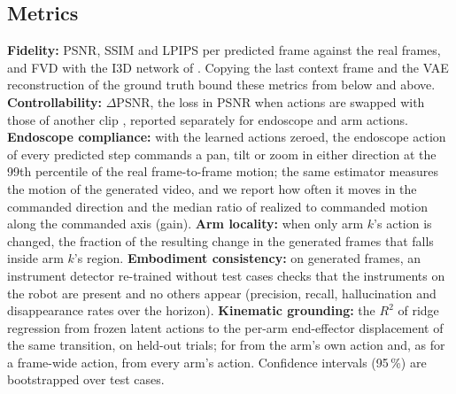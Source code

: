 \subsection{Metrics}
\textbf{Fidelity:} PSNR, SSIM \cite{ssim} and LPIPS \cite{lpips} per predicted frame against the real frames, and FVD \cite{fvd} with the I3D network of \cite{styleganv}. Copying the last context frame and the VAE reconstruction of the ground truth bound these metrics from below and above.
\textbf{Controllability:} $\Delta$PSNR, the loss in PSNR when actions are swapped with those of another clip \cite{genie,surgwm}, reported separately for endoscope and arm actions.
\textbf{Endoscope compliance:} with the learned actions zeroed, the endoscope action of every predicted step commands a pan, tilt or zoom in either direction at the 99th percentile of the real frame-to-frame motion; the same estimator measures the motion of the generated video, and we report how often it moves in the commanded direction and the median ratio of realized to commanded motion along the commanded axis (gain).
\textbf{Arm locality:} when only arm $k$'s action is changed, the fraction of the resulting change in the generated frames that falls inside arm $k$'s region.
\textbf{Embodiment consistency:} on generated frames, an instrument detector re-trained without test cases checks that the instruments on the robot are present and no others appear (precision, recall, hallucination and disappearance rates over the horizon).
\textbf{Kinematic grounding:} the $R^2$ of ridge regression from frozen latent actions to the per-arm end-effector displacement of the same transition, on held-out trials; for \method{} from the arm's own action and, as for a frame-wide action, from every arm's action.
Confidence intervals (95\,\%) are bootstrapped over test cases.

